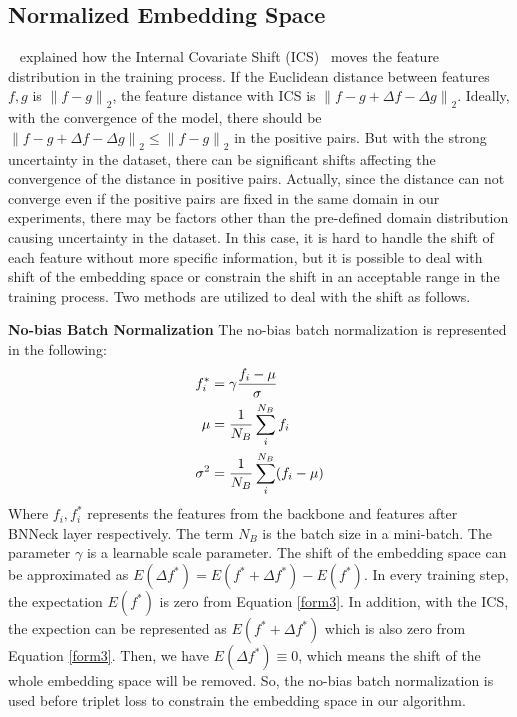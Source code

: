 \documentclass[a4paper,fleqn]{cas-dc}
\begin{document}
\subsection{Normalized Embedding Space}
~\cite{batchnorm}  explained how the Internal Covariate Shift (ICS)~\cite{batchnorm} moves the feature distribution in the training process. If the Euclidean distance  between features $f,g$ is $\left\|f-g\right\|_{2}$, the feature distance with ICS is $\left\|f-g+\Delta f- \Delta g\right\|_{2}$. Ideally, with the convergence of the model, there should be $\left\|f-g+\Delta f- \Delta g\right\|_{2} \leq \left\|f-g\right\|_{2}$ in the positive pairs. But with the strong uncertainty in the dataset, there can be significant shifts affecting the convergence of the distance in positive pairs. Actually, since the distance can not converge even if the positive pairs are fixed in the same domain in our experiments, there may be factors other than the pre-defined domain distribution causing uncertainty in the dataset. In this case, it is hard to handle the shift of each feature without more specific information, but it is possible to deal with shift of the embedding space or constrain the shift in an acceptable range in the training process. Two methods are utilized to deal with the shift as follows. \par
\noindent \textbf{No-bias Batch Normalization} The no-bias batch normalization is represented in the following:
\begin{equation}
\centering
\begin{split}
  f_{i}^{\ast}& = \gamma\frac{f_{i}-\mu}{\sigma}\\
  \mu& = \frac{1}{N_{B}}\sum^{N_{B}}_{i} f_{i}\\
  \sigma^{2}& = \frac{1}{N_{B}}\sum^{N_{B}}_{i} (f_{i}-\mu) 
\end{split}
\label{form3}
\end{equation}
Where $f_{i}, f_{i}^{\ast}$ represents the features from the backbone and features after BNNeck layer respectively. The term $N_{B}$ is the batch size in a mini-batch. The parameter $\gamma$ is a learnable scale parameter. The shift of the embedding space can be approximated as $E(\Delta f^{\ast})= E(f^{\ast}+\Delta f^{\ast}) - E(f^{\ast})$.  In every training step, the expectation $E(f^{\ast})$ is zero from Equation \ref{form3}. In addition, with the ICS, the expection can be represented as $E(f^{\ast}+\Delta f^{\ast})$ which is also zero from Equation \ref{form3}. Then, we have $E(\Delta f^{\ast}) \equiv 0$, which means the shift of the whole embedding space will be removed. So,  the no-bias batch normalization is used before triplet loss to constrain the embedding space in our algorithm.
\end{document}
